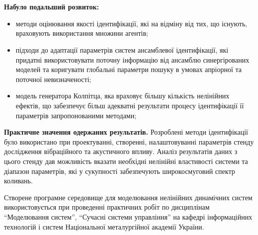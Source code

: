 \documentclass[14pt,handout,utf8]{beamer}
\begin{document}

\begin{frame}
  \frametitle{~}

  \noindent
  \textbf{ Набуло подальший розвиток:}
  \begin{itemize}

    \item
      методи оцінювання якості ідентифікації,
      які на відміну від тих, що існують,
      враховують використання множини агентів;

    \item
      підходи до адаптації параметрів систем
      ансамблевої ідентифікації, які придатні використовувати поточну
      інформацію від ансамблю синергірованих моделей та коригувати глобальні
      параметри пошуку в умовах апріорної та поточної невизначеності;

    \item
      модель генератора Колпітца, яка враховує
      більшу кількість нелінійних ефектів,
      що забезпечує більш адекватні результати процесу
      ідентифікації її параметрів запропонованими методами;
  \end{itemize}


\textbf{Практичне значення одержаних результатів.}
Розроблені методи ідентифікації було використано
при проектуванні, створенні, налаштовуванні параметрів
стенду дослідження вібраційного та акустичного впливу.
Аналіз результатів даних з цього стенду
дав можливість вказати необхідні нелінійні властивості системи
та діапазон параметрів, які у сукупності
забезпечують широкосмуговий спектр коливань.

Створене програмне середовище для моделювання нелінійних динамічних систем
використовується при проведенні практичних робіт по дисциплінам
``Моделювання систем'',
``Сучасні системи управління'' на кафедрі інформаційних технологій
і систем Національної металургійної академії України.

\end{frame}




\end{document}
